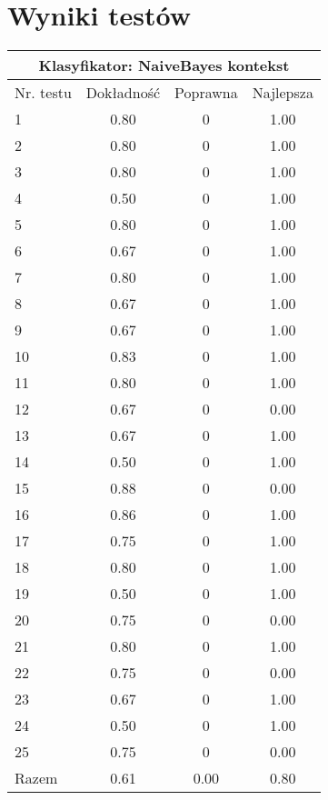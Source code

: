 \documentclass[notitlepage,leqno,fleqn,a4paper]{article}
\begin{document}
\section{Wyniki testów}

\begin{tabular}{|l|c|c|c|}
\hline
\multicolumn{4}{|c|}{Klasyfikator: NaiveBayes kontekst}\\
\hline
Nr. testu & Dokładność & Poprawna & Najlepsza\\
\hline
1 & 0.80 & 0 & 1.00 \\
2 & 0.80 & 0 & 1.00 \\
3 & 0.80 & 0 & 1.00 \\
4 & 0.50 & 0 & 1.00 \\
5 & 0.80 & 0 & 1.00 \\
6 & 0.67 & 0 & 1.00 \\
7 & 0.80 & 0 & 1.00 \\
8 & 0.67 & 0 & 1.00 \\
9 & 0.67 & 0 & 1.00 \\
10 & 0.83 & 0 & 1.00 \\
11 & 0.80 & 0 & 1.00 \\
12 & 0.67 & 0 & 0.00 \\
13 & 0.67 & 0 & 1.00 \\
14 & 0.50 & 0 & 1.00 \\
15 & 0.88 & 0 & 0.00 \\
16 & 0.86 & 0 & 1.00 \\
17 & 0.75 & 0 & 1.00 \\
18 & 0.80 & 0 & 1.00 \\
19 & 0.50 & 0 & 1.00 \\
20 & 0.75 & 0 & 0.00 \\
21 & 0.80 & 0 & 1.00 \\
22 & 0.75 & 0 & 0.00 \\
23 & 0.67 & 0 & 1.00 \\
24 & 0.50 & 0 & 1.00 \\
25 & 0.75 & 0 & 0.00 \\
\hline
Razem & 0.61 & 0.00 & 0.80 \\
\hline
\end{tabular}
\end{document}
